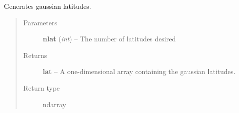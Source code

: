 \documentclass[letterpaper,10pt,english]{sphinxmanual}
\begin{document}

\begin{fulllineitems}
\label{atmos:atmos.util.gaussian_latitudes}
Generates gaussian latitudes.
\begin{quote}\begin{description}
\item[{Parameters}] \leavevmode
\textbf{nlat} (\emph{int}) -- The number of latitudes desired

\item[{Returns}] \leavevmode
\textbf{lat} --
A one-dimensional array containing the gaussian latitudes.

\item[{Return type}] \leavevmode
ndarray

\end{description}\end{quote}

\end{fulllineitems}

\end{document}
